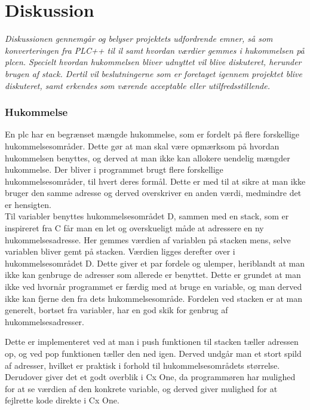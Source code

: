 \chapter{Diskussion}\label{sec:Diskussion}
\textit{Diskussionen gennemgår og belyser projektets udfordrende emner, så som konverteringen fra PLC++ til \gls{il} samt hvordan værdier gemmes i hukommelsen på \gls{plc}en.
Specielt hvordan hukommelsen bliver udnyttet vil blive diskuteret, herunder brugen af stack. 
Dertil vil beslutningerne som er foretaget igennem projektet blive diskuteret, samt erkendes som værende acceptable eller utilfredsstillende.}

\subsection*{Hukommelse}
En \gls{plc} har en begrænset mængde hukommelse, som er fordelt på flere forskellige hukommelsesområder.
Dette gør at man skal være opmærksom på hvordan hukommelsen benyttes, og derved at man ikke kan allokere uendelig mængder hukommelse.
Der bliver i programmet brugt flere forskellige hukommelsesområder, til hvert deres formål. Dette er med til at sikre at man ikke bruger den samme adresse og derved overskriver en anden værdi, medmindre det er hensigten.\\

\noindent Til variabler benyttes hukommelsesområdet D, sammen med en stack, som er inspireret fra C får man en let og overskueligt måde at adressere en ny hukommelsesadresse.
Her gemmes værdien af variablen på stacken mens, selve variablen bliver gemt på stacken.
Værdien ligges derefter over i hukommelsesområdet D.
Dette giver et par fordele og ulemper, heriblandt at man ikke kan genbruge de adresser som allerede er benyttet. Dette er grundet at man ikke ved hvornår programmet er færdig med at bruge en variable, og man derved ikke kan fjerne den fra dets hukommelsesområde.
Fordelen ved stacken er at man generelt, bortset fra variabler, har en god skik for genbrug af hukommelsesadresser.

Dette er implementeret ved at man i push funktionen til stacken tæller adressen op, og ved pop funktionen tæller den ned igen. Derved undgår man et stort spild af adresser, hvilket er praktisk i forhold til hukommelsesområdets størrelse.
Derudover giver det et godt overblik i Cx One, da programmøren har mulighed for at se værdien af den konkrete variable, og derved giver mulighed for at fejlrette kode direkte i Cx One.\\

